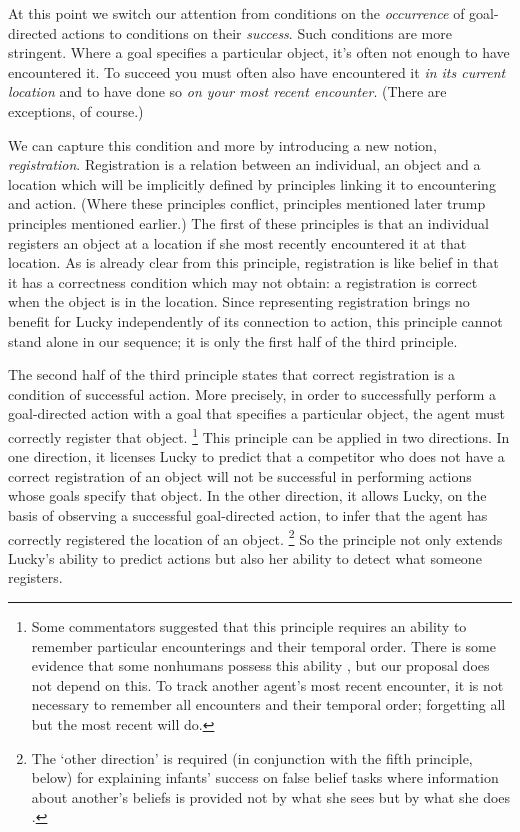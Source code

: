 \documentclass[12pt,\papersize]{extarticle}
\begin{document}
At this point we switch our attention from conditions on the \textit{occurrence} of goal-directed actions to conditions on their \textit{success}.  Such conditions are more stringent.  Where a goal specifies a particular object, it’s often not enough to have encountered it.  To succeed you must often also have encountered it \textit{in its current location} and to have done so \textit{on your most recent encounter}.  
(There are exceptions, of course.)

We can capture this condition and more by introducing a new notion, \textit{registration}.  Registration is a relation between an individual, an object and a location which will be implicitly defined by principles linking it to encountering and action.  (Where these principles conflict, principles mentioned later trump principles mentioned earlier.)  The first of these principles is that an individual registers an object at a location if she most recently encountered it at that location.  As is already clear from this principle, registration is like belief in that it has a correctness condition which may not obtain: a registration is correct when the object is in the location.   Since representing registration brings no benefit for Lucky independently of its connection to action, this principle cannot stand alone in our sequence; it is only the first half of the third principle.

The second half of the third principle states that correct registration is a condition of successful action.  More precisely, in order to successfully perform a goal-directed action with a goal that specifies a particular object, the agent must correctly register that object.%
\footnote{ 	
Some commentators suggested that this principle requires an ability to remember particular encounterings and their temporal order.  There is some evidence that some nonhumans possess this ability \citep[e.g.][]{en_1714, en_1715}, but our proposal does not depend on this.  To track another agent’s most recent encounter, it is not necessary to remember all encounters and their temporal order; forgetting all but the most recent will do.
}  
This principle can be applied in two directions.  In one direction, it licenses Lucky to predict that a competitor who does not have a correct registration of an object will not be successful in performing actions whose goals specify that object.  In the other direction, it allows Lucky, on the basis of observing a successful goal-directed action, to infer that the agent has correctly registered the location of an object.%
\footnote{ 	
The ‘other direction’ is required (in conjunction with the fifth principle, below) for explaining infants’ success on false belief tasks where information about another’s beliefs is provided not by what she sees but by what she does \citep[as in][]{en_1824}.
}
So the principle not only extends Lucky’s ability to predict actions but also her ability to detect what someone registers.  
\end{document}
